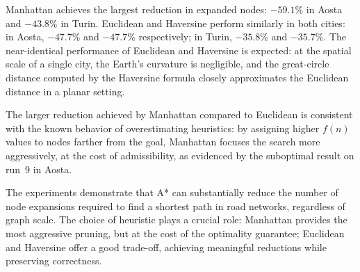 \documentclass[12pt,a4paper]{article}
\begin{document}
Manhattan achieves the largest reduction in expanded nodes: $-59.1\%$ in Aosta and $-43.8\%$ in Turin.
Euclidean and Haversine perform similarly in both cities: in Aosta, $-47.7\%$ and $-47.7\%$ respectively; in Turin, $-35.8\%$  and $-35.7\%$.
The near-identical performance of Euclidean and Haversine is expected: at the spatial scale of a single city, the Earth's curvature is negligible, and the great-circle distance computed by the Haversine formula closely approximates the Euclidean distance in a planar setting.

The larger reduction achieved by Manhattan compared to Euclidean is consistent with the known behavior of overestimating heuristics: by assigning higher $f(n)$ values to nodes farther from the goal, Manhattan focuses the search more aggressively, at the cost of admissibility, as evidenced by the suboptimal result on run~9 in Aosta.

The experiments demonstrate that A* can substantially reduce the number of node expansions required to find a shortest path in road networks, regardless of graph scale.
The choice of heuristic plays a crucial role: Manhattan provides the most aggressive pruning, but at the cost of the optimality guarantee; Euclidean and Haversine offer a good trade-off, achieving meaningful reductions while preserving correctness.

\end{document}
